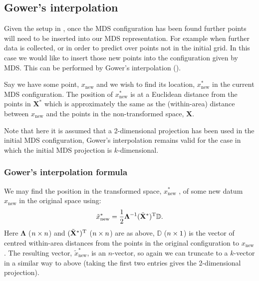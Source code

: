 \label{cor-r31-4}

\subsection{Gower's interpolation} 
\label{gowers}
Given the setup in , once the MDS configuration has been found further points will need to be inserted into our MDS representation. For example when further data is collected, or in order to predict over points not in the initial grid. In this case we would like to insert those new points into the configuration given by MDS. This can be performed by Gower's interpolation (\cite{gower1968}).

Say we have some point, $x_{\text{new}}$ and we wish to find its location, $x^*_{\text{new}}$ in the current MDS configuration. The position of $x^*_{\text{new}}$ is at a Euclidean distance from the points in $\mathbf{X}^*$ which is approximately the same as the (within-area) distance between $x_{\text{new}}$ and the points in the non-transformed space, $\mathbf{X}$. 

Note that here it is assumed that a 2-dimensional projection has been used in the initial MDS configuration, Gower's interpolation remains valid for the case in which the initial MDS projection is $k$-dimensional.

\subsubsection{Gower's interpolation formula}

We may find the position in the transformed space, $x^*_{\text{new}}$ , of some new datum $x_{\text{new}}$ in the original space using:
\begin{equation}
\tilde{x}^*_{\text{new}} = \frac{1}{2} \mathbf{\Lambda}^{-1} (\tilde{\mathbf{X}}^*)^{\text{T}} \mathbb{D}.
\label{gower}
\end{equation}
Here $\mathbf{\Lambda}$ ($n \times n$) and $(\tilde{\mathbf{X}}^*)^{\text{T}}$ ($n \times n$)\label{cor-r31-5} are as above, $\mathbb{D}$ ($n \times 1$) is the vector of centred within-area distances from the points in the original configuration to $x_{\text{new}}$. The resulting vector, $\tilde{x}^*_{\text{new}}$, is an $n$-vector, so again we can truncate to a $k$-vector in a similar way to above (taking the first two entries gives the 2-dimensional projection).

